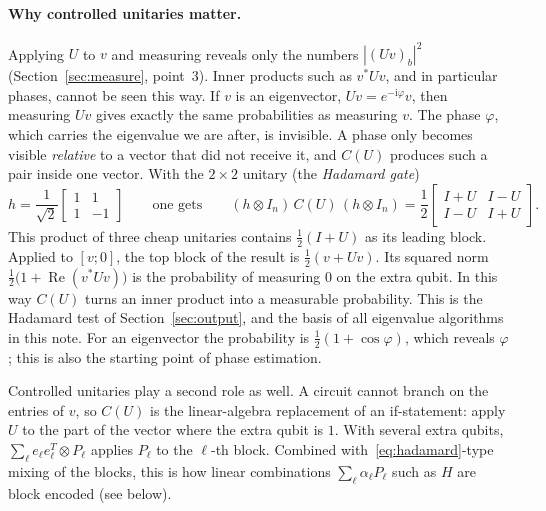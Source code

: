 \documentclass[11pt,a4paper]{article}
\begin{document}
\paragraph{Why controlled unitaries matter.} Applying $U$ to $v$ and
measuring reveals only the numbers $|(Uv)_b|^2$ (Section~\ref{sec:measure}, point~3).
Inner products such as $v^*Uv$, and in particular phases, cannot be seen
this way. If $v$ is an eigenvector, $Uv=e^{-\mathrm{i}\varphi}v$, then measuring
$Uv$ gives exactly the same probabilities as measuring $v$. The phase
$\varphi$, which carries the eigenvalue we are after, is invisible. A
phase only becomes visible \emph{relative} to a vector that did not
receive it, and $C(U)$ produces such a pair inside one vector. With the
$2\times2$ unitary (the \emph{Hadamard gate})
\begin{equation}\label{eq:hadamard}
  h=\frac1{\sqrt2}\begin{bmatrix}1&1\\1&-1\end{bmatrix}
  \qquad\text{one gets}\qquad
  (h\otimes I_n)\,C(U)\,(h\otimes I_n)=\frac12\begin{bmatrix}I+U & I-U\\ I-U & I+U\end{bmatrix}.
\end{equation}
This product of three cheap unitaries contains $\tfrac12(I+U)$ as its
leading block. Applied to $[v;0]$, the top block of the result is
$\tfrac12(v+Uv)$. Its squared norm $\tfrac12\big(1+\operatorname{Re}(v^*Uv)\big)$ is the
probability of measuring $0$ on the extra qubit. In this way $C(U)$
turns an inner product into a measurable probability. This is the
Hadamard test of Section~\ref{sec:output}, and the basis of all
eigenvalue algorithms in this note. For an eigenvector the probability
is $\tfrac12(1+\cos\varphi)$, which reveals $\varphi$; this is also the
starting point of phase estimation.

Controlled unitaries play a second role as well. A circuit cannot branch
on the entries of $v$, so $C(U)$ is the linear-algebra replacement of an
if-statement: apply $U$ to the part of the vector where the extra qubit
is $1$. With several extra qubits,
$\sum_\ell e_\ell e_\ell^T\otimes P_\ell$ applies $P_\ell$ to the $\ell$-th block.
Combined with~\eqref{eq:hadamard}-type mixing of the blocks, this is how
linear combinations $\sum_\ell\alpha_\ell P_\ell$ such as $H$ are block encoded
(see below).
\end{document}

